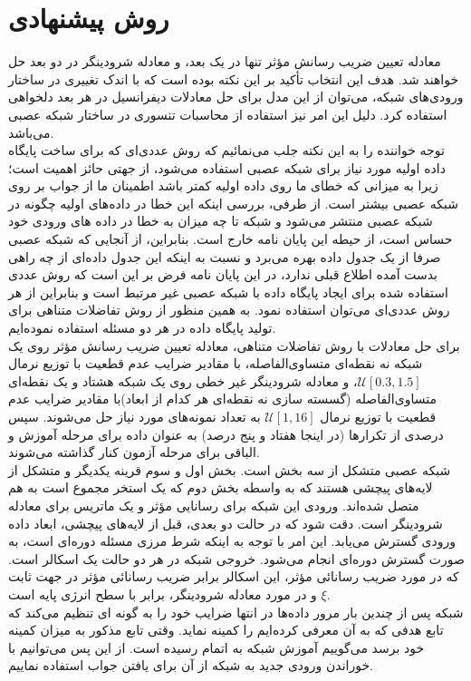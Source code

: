 \section*{روش پیشنهادی }
معادله تعیین ضریب رسانش مؤثر تنها در یک بعد، و معادله شرودینگر در دو بعد حل خواهند شد. هدف این انتخاب تأکید بر این نکته بوده است که با اندک تغییری در ساختار ورودی‌های شبکه، می‌توان از این مدل برای حل معادلات دیفرانسیل در هر بعد دلخواهی استفاده کرد. دلیل این امر نیز استفاده از محاسبات تنسوری در ساختار شبکه عصبی می‌باشد.\\
توجه خواننده را به این نکته جلب می‌نمائیم که روش عددی‌ای که برای ساخت پایگاه داده اولیه مورد نیاز برای شبکه عصبی استفاده می‌شود، از جهتی حائز اهمیت است؛ زیرا به میزانی که خطای ما روی داده اولیه کمتر باشد اطمینان ما از جواب بر روی شبکه عصبی بیشتر است. از طرفی، بررسی اینکه این خطا در داده‌های اولیه چگونه در شبکه عصبی منتشر می‌شود و شبکه تا چه میزان به خطا در داده های ورودی خود حساس است، از حیطه این پایان نامه خارج است. بنابراین، از آنجایی که شبکه عصبی صرفا از یک جدول داده بهره می‌برد و نسبت به اینکه این جدول داده‌ای از چه راهی بدست آمده اطلاع قبلی ندارد، در این پایان نامه فرض بر این است که روش عددی استفاده شده برای ایجاد پایگاه داده با شبکه عصبی غیر مرتبط است و بنابراین از هر روش عددی‌ای می‌توان استفاده نمود. به همین منظور از روش تفاضلات متناهی برای تولید پایگاه داده در هر دو مسئله استفاده نموده‌ایم.\\
برای حل معادلات با روش تفاضلات متناهی، معادله تعیین ضریب رسانش مؤثر روی یک شبکه نه نقطه‌ای متساوی‌الفاصله، با مقادیر ضرایب عدم قطعیت با توزیع نرمال $\mathcal{U}[0.3, 1.5]$، و معادله شرودینگر غیر خطی روی یک شبکه هشتاد و یک نقطه‌ای متساوی‌الفاصله (گسسته سازی نه نقطه‌ای هر کدام از ابعاد)با مقادیر ضرایب عدم قطعیت با توزیع نرمال $\mathcal{U}[1, 16]$ به تعداد نمونه‌های مورد نیاز حل می‌شوند. سپس درصدی از تکرارها (در اینجا هفتاد و پنج درصد) به عنوان داده برای مرحله آموزش و الباقی برای مرحله آزمون کنار گذاشته می‌شوند.\\
شبکه عصبی متشکل از سه بخش است. بخش اول و سوم قرینه یکدیگر و متشکل از لایه‌های پیچشی   هستند که به واسطه بخش دوم که یک استخر مجموع  است به هم متصل شده‌اند. ورودی این شبکه برای رسانایی مؤثر و یک ماتریس برای معادله شرودینگر است. دقت شود که در حالت دو بعدی، قبل از لایه‌های پیچشی، ابعاد داده ورودی گسترش می‌یابد. این امر با توجه به اینکه شرط مرزی مسئله دوره‌ای است، به صورت گسترش دوره‌ای انجام می‌شود. خروجی شبکه در هر دو حالت یک اسکالر است. که در مورد ضریب رسانائی مؤثر، این اسکالر برابر ضریب رسانائی مؤثر در جهت ثابت $\xi$ و در مورد معادله شرودینگر، برابر با سطح انرژی پایه است.\\
شبکه پس از چندین بار مرور داده‌ها در انتها ضرایب خود را به گونه ای تنظیم می‌کند که تابع هدفی که به آن معرفی کرده‌ایم را کمینه نماید. وقتی تابع مذکور به میزان کمینه خود برسد می‌گوییم آموزش شبکه به اتمام رسیده است. از این پس می‌توانیم با خوراندن ورودی جدید به شبکه از آن برای یافتن جواب استفاده نماییم.\\
